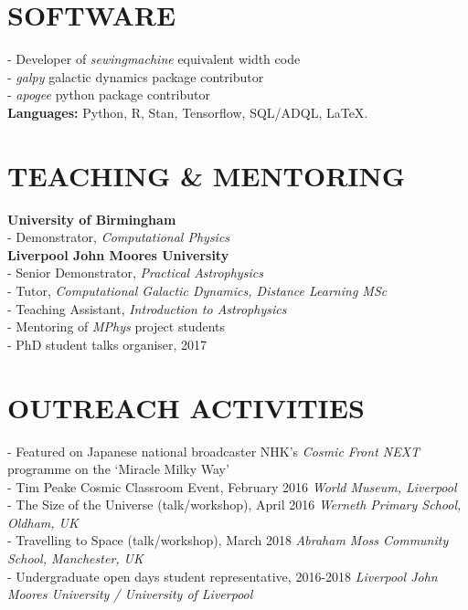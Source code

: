 \documentclass[margin]{res}
\begin{document}
\begin{resume}
\section{SOFTWARE}
\par
- Developer of \emph{sewingmachine} equivalent width code\\
- \emph{galpy} galactic dynamics package contributor\\
- \emph{apogee} python package contributor\\
\textbf{Languages:} Python, R, Stan, Tensorflow, SQL/ADQL, \LaTeX.\\

\section{TEACHING \& MENTORING}
\par 
\textbf{University of Birmingham}\\
- Demonstrator, \emph{Computational Physics}\\
\textbf{Liverpool John Moores University}\\
- Senior Demonstrator, \emph{Practical Astrophysics}\\
- Tutor, \emph{Computational Galactic Dynamics, Distance Learning MSc}\\
- Teaching Assistant, \emph{Introduction to Astrophysics}\\
- Mentoring of \emph{MPhys} project students\\
- PhD student talks organiser, 2017

\section{OUTREACH ACTIVITIES}
\par
- Featured on Japanese national broadcaster NHK's \emph{Cosmic Front NEXT} programme on the `Miracle Milky Way'\\
- Tim Peake Cosmic Classroom Event, February 2016 \emph{World Museum, Liverpool}\\
- The Size of the Universe (talk/workshop), April 2016 \emph{Werneth Primary School, Oldham, UK}\\
- Travelling to Space (talk/workshop), March 2018 \emph{Abraham Moss Community School, Manchester, UK}\\
- Undergraduate open days student representative, 2016-2018 \emph{Liverpool John Moores University / University of Liverpool}


\end{resume}
\end{document}
